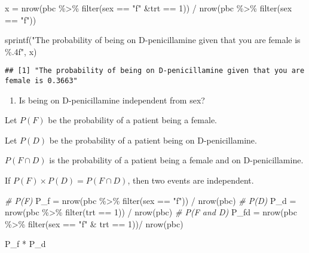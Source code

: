 \documentclass[
]{article}
\newenvironment{Shaded}{\begin{snugshade}}{\end{snugshade}}
\newcommand{\CommentTok}[1]{\textcolor[rgb]{0.56,0.35,0.01}{\textit{#1}}}
\newcommand{\DecValTok}[1]{\textcolor[rgb]{0.00,0.00,0.81}{#1}}
\newcommand{\FunctionTok}[1]{\textcolor[rgb]{0.00,0.00,0.00}{#1}}
\newcommand{\NormalTok}[1]{#1}
\newcommand{\OtherTok}[1]{\textcolor[rgb]{0.56,0.35,0.01}{#1}}
\newcommand{\SpecialCharTok}[1]{\textcolor[rgb]{0.00,0.00,0.00}{#1}}
\newcommand{\StringTok}[1]{\textcolor[rgb]{0.31,0.60,0.02}{#1}}
\providecommand{\tightlist}{%
  \setlength{\itemsep}{0pt}\setlength{\parskip}{0pt}}
\begin{document}
\begin{Shaded}
\begin{Highlighting}[]
\NormalTok{x }\OtherTok{=} \FunctionTok{nrow}\NormalTok{(pbc }\SpecialCharTok{\%\textgreater{}\%} 
           \FunctionTok{filter}\NormalTok{(sex }\SpecialCharTok{==} \StringTok{"f"} \SpecialCharTok{\&}\NormalTok{trt }\SpecialCharTok{==} \DecValTok{1}\NormalTok{)) }\SpecialCharTok{/} 
  \FunctionTok{nrow}\NormalTok{(pbc }\SpecialCharTok{\%\textgreater{}\%} 
         \FunctionTok{filter}\NormalTok{(sex }\SpecialCharTok{==} \StringTok{"f"}\NormalTok{))}

\FunctionTok{sprintf}\NormalTok{(}\StringTok{"The probability of being on D{-}penicillamine given that you are female is \%.4f"}\NormalTok{, x)}
\end{Highlighting}
\end{Shaded}

\begin{verbatim}
## [1] "The probability of being on D-penicillamine given that you are female is 0.3663"
\end{verbatim}

\begin{enumerate}
\def\labelenumi{\alph{enumi})}
\setcounter{enumi}{4}
\tightlist
\item
  Is being on D-penicillamine independent from sex?
\end{enumerate}

Let \(P(F)\) be the probability of a patient being a female.

Let \(P(D)\) be the probability of a patient being on D-penicillamine.

\(P(F \cap D)\) is the probability of a patient being a female and on
D-penicillamine.

If \(P(F) \times P(D) = P(F \cap D)\), then two events are independent.

\begin{Shaded}
\begin{Highlighting}[]
\CommentTok{\# P(F)}
\NormalTok{P\_f }\OtherTok{=} \FunctionTok{nrow}\NormalTok{(pbc }\SpecialCharTok{\%\textgreater{}\%} \FunctionTok{filter}\NormalTok{(sex }\SpecialCharTok{==} \StringTok{"f"}\NormalTok{)) }\SpecialCharTok{/} 
  \FunctionTok{nrow}\NormalTok{(pbc)}
\CommentTok{\# P(D)}
\NormalTok{P\_d }\OtherTok{=} \FunctionTok{nrow}\NormalTok{(pbc }\SpecialCharTok{\%\textgreater{}\%} \FunctionTok{filter}\NormalTok{(trt }\SpecialCharTok{==} \DecValTok{1}\NormalTok{)) }\SpecialCharTok{/}
  \FunctionTok{nrow}\NormalTok{(pbc)}
\CommentTok{\# P(F and D)}
\NormalTok{P\_fd }\OtherTok{=} \FunctionTok{nrow}\NormalTok{(pbc }\SpecialCharTok{\%\textgreater{}\%} \FunctionTok{filter}\NormalTok{(sex }\SpecialCharTok{==} \StringTok{"f"} \SpecialCharTok{\&}\NormalTok{ trt }\SpecialCharTok{==} \DecValTok{1}\NormalTok{))}\SpecialCharTok{/}
  \FunctionTok{nrow}\NormalTok{(pbc)}

\NormalTok{P\_f }\SpecialCharTok{*}\NormalTok{ P\_d}
\end{Highlighting}
\end{Shaded}
\end{document}
